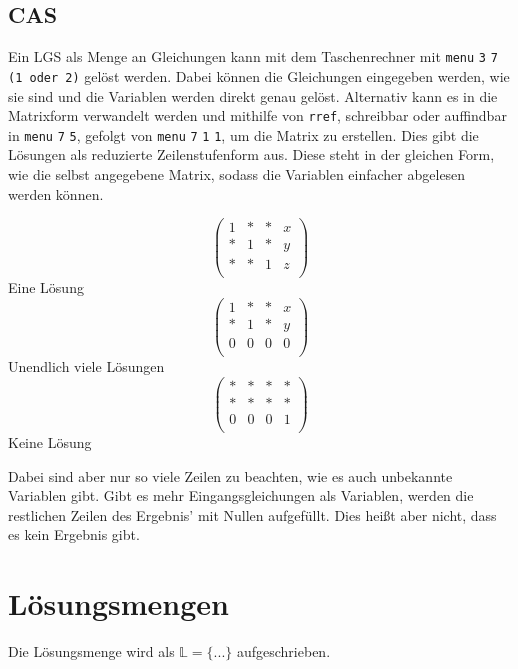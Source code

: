 \documentclass{article}
\begin{document}
\subsection{CAS}
Ein LGS als Menge an Gleichungen kann mit dem Taschenrechner mit \texttt{menu} \textrightarrow{} \texttt{3} \textrightarrow{} \texttt{7} \textrightarrow{} \texttt{(1 oder 2)} gelöst werden. Dabei können die Gleichungen eingegeben werden, wie sie sind und die Variablen werden direkt genau gelöst. \newline
Alternativ kann es in die Matrixform verwandelt werden und mithilfe von \texttt{rref}, schreibbar oder auffindbar in \texttt{menu} \textrightarrow{} \texttt{7} \textrightarrow{} \texttt{5}, gefolgt von \texttt{menu} \textrightarrow{} \texttt{7} \textrightarrow{} \texttt{1} \textrightarrow{} \texttt{1}, um die Matrix zu erstellen. Dies gibt die Lösungen als reduzierte Zeilenstufenform aus. Diese steht in der gleichen Form, wie die selbst angegebene Matrix, sodass die Variablen einfacher abgelesen werden können.
\begin{multicols}{3}
 \noindent
 \[
 \begin{pmatrix}
  1 & * & * & x \\
  * & 1 & * & y \\
  * & * & 1 & z \\
 \end{pmatrix}
 \]
 \centering Eine Lösung
 \columnbreak
 \noindent
 \[
 \begin{pmatrix}
  1 & * & * & x \\
  * & 1 & * & y \\
  0 & 0 & 0 & 0 \\
 \end{pmatrix}
 \]
 \centering Unendlich viele Lösungen  
 \columnbreak
 \noindent
 \[
 \begin{pmatrix}
  * & * & * & * \\
  * & * & * & * \\
  0 & 0 & 0 & 1 \\
 \end{pmatrix}
 \]
 \centering Keine Lösung  
\end{multicols} 
\noindent Dabei sind aber nur so viele Zeilen zu beachten, wie es auch unbekannte Variablen gibt. Gibt es mehr Eingangsgleichungen als Variablen, werden die restlichen Zeilen des Ergebnis' mit Nullen aufgefüllt. Dies heißt aber nicht, dass es kein Ergebnis gibt.
 
\section{Lösungsmengen}
Die Lösungsmenge wird als $\mathbb{L} = \{...\}$ aufgeschrieben.
 
\end{document}
